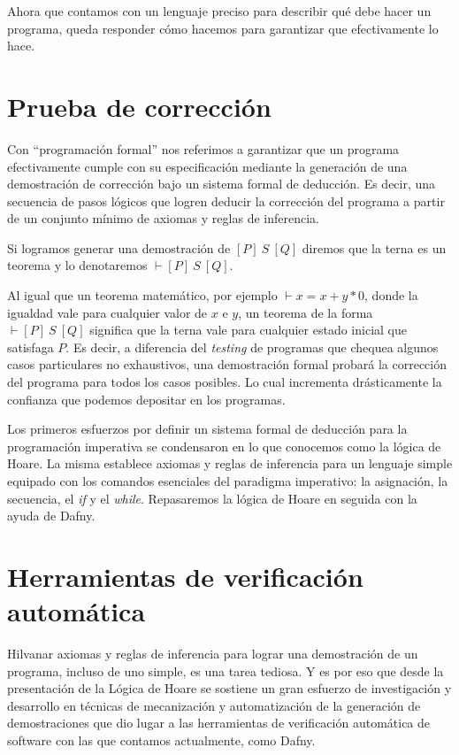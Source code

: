 \documentclass[12pt, a4paper, openany, fleqn]{book}
\newcommand{\hoare}[3]{\ensuremath{[#1]\ #2\ [#3]}}
\newcommand{\hoareTheoremBkp}[3]{\ensuremath{\vdash[#1]\ #2\ [#3]}}
\begin{document}
    Ahora que contamos con un lenguaje preciso para describir qué debe hacer un programa, queda responder cómo hacemos para garantizar que efectivamente lo hace.

    \section{Prueba de corrección}
    Con ``programación formal'' nos referimos a garantizar que un programa efectivamente cumple con su especificación mediante la generación de una demostración de corrección bajo un sistema formal de deducción. Es decir, una secuencia de pasos lógicos que logren deducir la corrección del programa a partir de un conjunto mínimo de axiomas y reglas de inferencia.

    Si logramos generar una demostración de \hoare{P}{S}{Q} diremos que la terna es un teorema y lo denotaremos \hoareTheoremBkp{P}{S}{Q}.

    Al igual que un teorema matemático, por ejemplo $\vdash x = x + y * 0$, donde la igualdad vale para cualquier valor de $x$ e $y$, un teorema de la forma \hoareTheoremBkp{P}{S}{Q} significa que la terna vale para cualquier estado inicial que satisfaga $P$. Es decir, a diferencia del \textit{testing} de programas que chequea algunos casos particulares no exhaustivos, una demostración formal probará la corrección del programa para todos los casos posibles. Lo cual incrementa drásticamente la confianza que podemos depositar en los programas.

    Los primeros esfuerzos por definir un sistema formal de deducción para la programación imperativa se condensaron en lo que conocemos como la lógica de Hoare.
    La misma establece axiomas y reglas de inferencia para un lenguaje simple equipado con los comandos esenciales del paradigma imperativo: la asignación, la secuencia, el \textit{if} y el \textit{while}. Repasaremos la lógica de Hoare en seguida con la ayuda de Dafny.

    \section{Herramientas de verificación automática}
    Hilvanar axiomas y reglas de inferencia para lograr una demostración de un programa, incluso de uno simple, es una tarea tediosa. Y es por eso que desde la presentación de la Lógica de Hoare se sostiene un gran esfuerzo de investigación y desarrollo en técnicas de mecanización y automatización de la generación de demostraciones que dio lugar a las herramientas de verificación automática de software con las que contamos actualmente, como Dafny.
\end{document}
